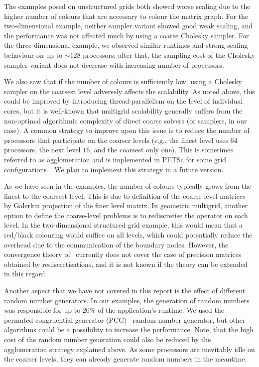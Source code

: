 \documentclass[
fontsize=11pt,
paper=a4,
numbers=noenddot
]{scrartcl}
\begin{document}
The examples posed on unstructured grids both showed worse scaling due to the higher number of colours that are necessary to colour the matrix graph. For the two-dimensional example, neither sampler variant showed good weak scaling, and the performance was not affected much by using a coarse Cholesky sampler. For the three-dimensional example, we observed similar runtimes and strong scaling behaviour on up to $\sim 128$ processors; after that, the sampling cost of the Cholesky sampler variant does not decrease with increasing number of processors.

We also saw that if the number of colours is sufficiently low, using a Cholesky sampler on the coarsest level adversely affects the scalability. As noted above, this could be improved by introducing thread-parallelism on the level of individual cores, but it is well-known that multigrid scalability generally suffers from the non-optimal algorithmic complexity of direct coarse solvers (or samplers, in our case). A common strategy to improve upon this issue is to reduce the number of processors that participate on the coarser levels (e.g., the finest level uses $64$ processors, the next level $16$, and the coarsest only one). This is sometimes referred to as agglomeration and is implemented in PETSc for some grid configurations~\cite{petsc-multigrid}. We plan to implement this strategy in a future version.

As we have seen in the examples, the number of colours typically grows from the finest to the coarsest level. This is due to definition of the coarse-level matrices by Galerkin projection of the finer level matrix. In geometric multigrid, another option to define the coarse-level problems is to rediscretise the operator on each level. In the two-dimensional structured grid example, this would mean that a red/black colouring would suffice on all levels, which could potentially reduce the overhead due to the communication of the boundary nodes. However, the convergence theory of~\cite{kazashimuellerscheichl} currently does not cover the case of precision matrices obtained by rediscretisations, and it is not known if the theory can be extended in this regard.

Another aspect that we have not covered in this report is the effect of different random number generators. In our examples, the generation of random numbers was responsible for up to 20\% of the application's runtime. We used the permuted congruential generator (PCG)~\cite{oneill:pcg2014} random number generator, but other algorithms could be a possibility to increase the performance. Note, that the high cost of the random number generation could also be reduced by the agglomeration strategy explained above. As some processors are inevitably idle on the coarser levels, they can already generate random numbers in the meantime.

\printbibliography
\end{document}
